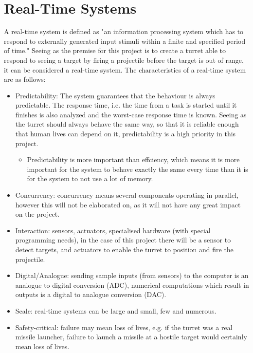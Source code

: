 \section{Real-Time Systems}

A real-time system is defined as "an information processing system which has to respond to externally generated input stimuli within a finite and specified period of time." \cite{realtime} Seeing as the premise for this project is to create a turret able to respond to seeing a target by firing a projectile before the target is out of range, it can be considered a real-time system. The characteristics of a real-time system are as follows:
\begin{itemize}
	\item Predictability: The system guarantees that the behaviour is always predictable. The response time, i.e. the time from a task is started until it finishes is also analyzed and the worst-case response time is known. Seeing as the turret should always behave the same way, so that it is reliable enough that human lives can depend on it, predictability is a high priority in this project.
		\begin{itemize}
			\item Predictability is more important than effciency, which means it is more important for the system to behave exactly the same every time than it is for the system to not use a lot of memory.
		\end{itemize}
	\item Concurrency: concurrency means several components operating in parallel, however this will not be elaborated on, as it will not have any great impact on the project. 
	\item Interaction: sensors, actuators, specialised hardware (with special programming needs), in the case of this project there will be a sensor to detect targets, and actuators to enable the turret to position and fire the projectile.
	\item Digital/Analogue: sending sample inputs (from sensors) to the computer is an analogue to digital conversion (ADC), numerical computations which result in outputs is a digital to analogue conversion (DAC).
	\item Scale: real-time systems can be large and small, few and numerous.
	\item Safety-critical: failure may mean loss of lives, e.g. if the turret was a real missile launcher, failure to launch a missile at a hostile target would certainly mean loss of lives.
\end{itemize}\cite{realtime}

